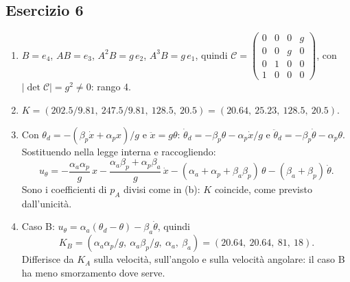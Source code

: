 \documentclass[11pt,a4paper]{article}
\begin{document}
\subsection*{Esercizio 6}
\begin{enumerate}[label=(\alph*)]
  \item $B = e_4$, $AB = e_3$, $A^2B = g\,e_2$, $A^3B = g\,e_1$, quindi
  $\mathcal{C} = \begin{pmatrix} 0&0&0&g \\ 0&0&g&0 \\ 0&1&0&0 \\ 1&0&0&0 \end{pmatrix}$, con $|\det\mathcal{C}| = g^2 \neq 0$: rango 4.
  \item $K = (202.5/9.81,\ 247.5/9.81,\ 128.5,\ 20.5) = (20.64,\ 25.23,\ 128.5,\ 20.5)$.
  \item Con $\theta_d = -(\beta_p\dot x + \alpha_p x)/g$ e $\ddot x = g\theta$: $\dot\theta_d = -\beta_p\theta - \alpha_p\dot x/g$ e $\ddot\theta_d = -\beta_p\dot\theta - \alpha_p\theta$. Sostituendo nella legge interna e raccogliendo:
  \[
  u_\theta = -\frac{\alpha_a\alpha_p}{g}\,x - \frac{\alpha_a\beta_p + \alpha_p\beta_a}{g}\,\dot x - (\alpha_a + \alpha_p + \beta_a\beta_p)\,\theta - (\beta_a + \beta_p)\,\dot\theta .
  \]
  Sono i coefficienti di $p_A$ divisi come in (b): $K$ coincide, come previsto dall'unicità.
  \item Caso B: $u_\theta = \alpha_a(\theta_d - \theta) - \beta_a\dot\theta$, quindi
  \[
  K_B = (\alpha_a\alpha_p/g,\ \alpha_a\beta_p/g,\ \alpha_a,\ \beta_a) = (20.64,\ 20.64,\ 81,\ 18).
  \]
  Differisce da $K_A$ sulla velocità, sull'angolo e sulla velocità angolare: il caso B ha meno smorzamento dove serve.
\end{enumerate}
\end{document}
